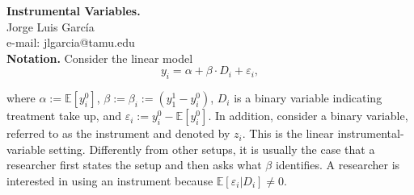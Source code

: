 
\let\counterwithout\relax
\let\counterwithin\relax
{}



\noindent \textbf{Instrumental Variables.}\\
\noindent Jorge Luis García \\
\noindent e-mail: jlgarcia@tamu.edu\\

\noindent \textbf{Notation.} Consider the linear model 
\begin{equation}
y_{i} = \alpha + \beta \cdot D_{i} + \varepsilon_{i}, \label{eq:main}
\end{equation}

\noindent where $\alpha := \mathbb{E} \left[ y_{i}^0 \right]$, $\beta := \beta_{i}:= \left( y_{1}^1 - y_{i}^0 \right)$, $D_{i}$ is a binary variable indicating treatment take up, and $\varepsilon_{i}:= y_{i}^0 - \mathbb{E} \left[ y_{i}^0 \right]$. In addition, consider a binary variable, referred to as the instrument and denoted by $z_{i}$. This is the linear instrumental-variable setting. Differently from other setups, it is usually the case that a researcher first states the setup and then asks what $\beta$ identifies. A researcher is interested in using an instrument because $\mathbb{E} \left[ \varepsilon_{i} | D_{i} \right] \neq 0$.\\

